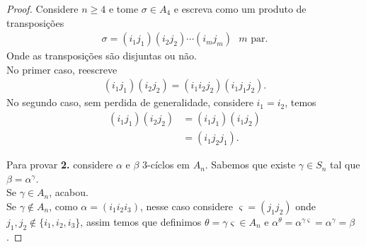 \begin{proof} 
  Considere $n\geq 4$ e tome $\sigma\in A_4$ e escreva como um produto de transposições
  \begin{align*}
    \sigma=(i_1j_1)(i_2j_2)\cdots(i_mj_m)\text{ $m$ par.}
  \end{align*}
  Onde as transposições são disjuntas ou não.\\
  No primer caso, reescreve
  \begin{align*}
    (i_1j_1)(i_2j_2)=(i_1i_2j_2)(i_1j_1j_2).
  \end{align*}
  No segundo caso, sem perdida de generalidade, considere $i_1=i_2$, temos
  \begin{align*}
    (i_1j_1)(i_2j_2)&=(i_1j_1)(i_1j_2)\\
    &=(i_1j_2j_1).
  \end{align*}

  Para provar \textbf{2.} considere $\alpha$ e $\beta$ $3$-cíclos em $A_n$. Sabemos que existe $\gamma\in S_n$ tal que $\beta=\alpha^{\gamma}$.\\
  Se $\gamma\in A_n$, acabou.\\
  Se $\gamma\notin A_n$, como $\alpha=(i_1i_2i_3)$, nesse caso considere $\varsigma=(j_1j_2)$ onde $j_1,j_2\notin\{i_1,i_2,i_3\}$, assim temos que definimos $\theta=\gamma\varsigma\in A_n$ e $\alpha^{\theta}=\alpha^{\gamma\varsigma}=\alpha^{\gamma}=\beta$. 
\end{proof}


